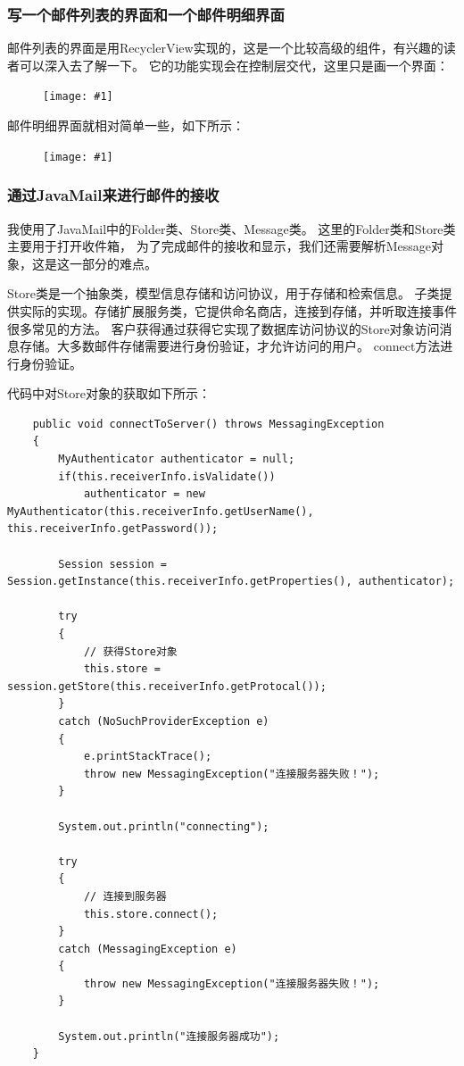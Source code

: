 \documentclass[a4paper,left=2.5cm,right=2.5cm,11pt]{article}
\newcommand{\fic}[1]{\begin{figure}[H]
		\center
		\texttt{[image: \#1]}
	\end{figure}}
\begin{document}
\subsubsection{写一个邮件列表的界面和一个邮件明细界面}
	邮件列表的界面是用RecyclerView实现的，这是一个比较高级的组件，有兴趣的读者可以深入去了解一下。
	它的功能实现会在控制层交代，这里只是画一个界面：
	\fic{12.png}

	邮件明细界面就相对简单一些，如下所示：
	\fic{13.png}

\subsubsection{通过JavaMail来进行邮件的接收}
	我使用了JavaMail中的Folder类、Store类、Message类。
	这里的Folder类和Store类主要用于打开收件箱，
	为了完成邮件的接收和显示，我们还需要解析Message对象，这是这一部分的难点。\par

	Store类是一个抽象类，模型信息存储和访问协议，用于存储和检索信息。
	子类提供实际的实现。存储扩展服务类，它提供命名商店，连接到存储，并听取连接事件很多常见的方法。
	客户获得通过获得它实现了数据库访问协议的Store对象访问消息存储。大多数邮件存储需要进行身份验证，才允许访问的用户。 
	connect方法进行身份验证。\par

	代码中对Store对象的获取如下所示：
	\begin{lstlisting}
	public void connectToServer() throws MessagingException
    {
        MyAuthenticator authenticator = null;
        if(this.receiverInfo.isValidate())
            authenticator = new MyAuthenticator(this.receiverInfo.getUserName(), this.receiverInfo.getPassword());

        Session session = Session.getInstance(this.receiverInfo.getProperties(), authenticator);

        try
        {
			// 获得Store对象
            this.store = session.getStore(this.receiverInfo.getProtocal());
        }
        catch (NoSuchProviderException e)
        {
            e.printStackTrace();
            throw new MessagingException("连接服务器失败！");
        }

        System.out.println("connecting");

        try
        {
			// 连接到服务器
            this.store.connect();
        }
        catch (MessagingException e)
        {
            throw new MessagingException("连接服务器失败！");
        }

        System.out.println("连接服务器成功");
    }
	\end{lstlisting}
\end{document}
